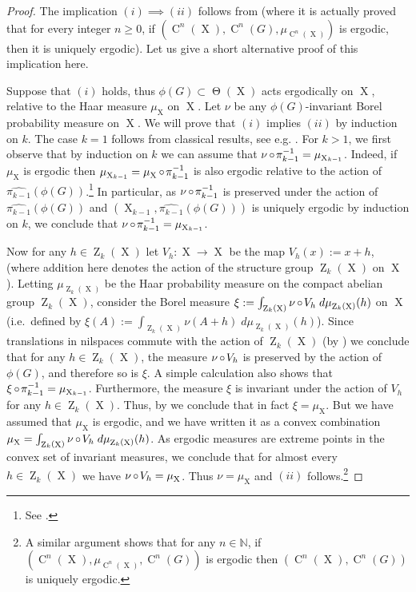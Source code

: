 \documentclass[a4paper,12pt,reqno]{amsart}
\theoremstyle{definition}
\newcommand{\mb}{\mathbb}
\DeclareMathOperator{\ab}{Z}
\DeclareMathOperator{\tran}{\Theta}
\DeclareMathOperator{\ns}{X}
\DeclareMathOperator{\co}{\circ\hspace{-0.02 cm}}
\DeclareMathOperator{\cu}{C}
\begin{document}
\begin{proof}
The implication $(i)\implies (ii)$ follows from \cite[Lemma 5.6]{CGSS-p-hom} (where it is actually proved that for every integer $n\geq 0$, if $(\cu^n(\ns),\cu^n(G),\mu_{\cu^n(\ns)})$ is ergodic, then it is uniquely ergodic). Let us give  a short alternative proof of this implication here.

Suppose that $(i)$ holds, thus $\phi(G)\subset \tran(\ns)$ acts ergodically on $\ns$, relative to the Haar measure $\mu_{\ns}$ on $\ns$. Let $\nu$ be any $\phi(G)$-invariant Borel probability measure on $\ns$. We will prove that $(i)$ implies $(ii)$ by induction on $k$. The case $k=1$ follows from classical results, see e.g. \cite[Proposition 4.3.3]{Hass&Katok}. For $k>1$, we first observe that by induction on $k$ we can assume that $\nu\co \pi_{k-1}^{-1}=\mu_{\ns_{k-1}}$. Indeed, if $\mu_{\ns}$ is ergodic then $\mu_{\ns_{k-1}}=\mu_{\ns}\co \pi_{k-1}^{-1}$ is also ergodic relative to the action of $\widehat{\pi_{k-1}}(\phi(G))$.\footnote{See \cite[Lemma 1.5]{CGSS}.} In particular, as $\nu\co \pi_{k-1}^{-1}$ is preserved under the action of $\widehat{\pi_{k-1}}(\phi(G))$ and $(\ns_{k-1},\widehat{\pi_{k-1}}(\phi(G)))$ is uniquely ergodic by induction on $k$, we conclude that $\nu\co\pi_{k-1}^{-1} = \mu_{\ns_{k-1}}$.

Now for any $h\in\ab_k(\ns)$ let $V_h:\ns\to \ns$ be the map $V_h(x):=x+h$, (where addition here denotes the action of the structure group $\ab_k(\ns)$ on $\ns$). Letting $\mu_{\ab_k(\ns)}$ be the Haar probability measure on the compact abelian group $\ab_k(\ns)$, consider the Borel measure $\xi:=\int_{\ab_k(\ns)}\nu\co V_h\;d\mu_{\ab_k(\ns)}(h)$ on $\ns$ (i.e.\ defined by $\xi(A):=\int_{\ab_k(\ns)}\nu(A+h)\;d\mu_{\ab_k(\ns)}(h)$). Since  translations in nilspaces commute with the action of $ \ab_k(\ns)$ (by \cite[Lemma 3.2.37]{Cand:Notes1}) we conclude that for any $h\in \ab_k(\ns)$, the measure $\nu\co V_h$ is preserved by the action of $\phi(G)$, and therefore so is $\xi$. A simple calculation also shows that $\xi\co\pi_{k-1}^{-1}=\mu_{\ns_{k-1}}$. Furthermore, the measure $\xi$ is invariant under the action of $V_h$ for any $h\in \ab_k(\ns)$. Thus, by \cite[Proposition 2.2.5]{Cand:Notes2} we conclude that in fact $\xi = \mu_{\ns}$. But we have assumed that $\mu_{\ns}$ is ergodic, and we have written it as a convex combination $\mu_{\ns}=\int_{\ab_k(\ns)} \nu \co V_h\;d\mu_{\ab_k(\ns)}(h)$. As ergodic measures are extreme points in the convex set of invariant measures, we conclude that for almost every $h\in \ab_k(\ns)$ we have $\nu\co V_h=\mu_{\ns}$. Thus $\nu=\mu_{\ns}$ and $(ii)$ follows.\footnote{A similar argument shows that for any $n\in \mb{N}$, if $(\cu^n(\ns),\mu_{\cu^n(\ns)},\cu^n(G))$ is ergodic then $(\cu^n(\ns),\cu^n(G))$ is uniquely ergodic.}


\end{proof}
\end{document}
